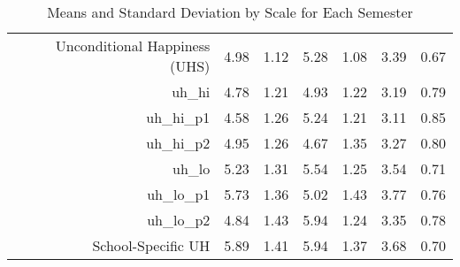 \begin{table}[ht]
\begin{tabular}{rrrrrrr}
  Unconditional Happiness (UHS) & 4.98 & 1.12 & 5.28 & 1.08 & 3.39 & 0.67 \\ 
  uh\_hi & 4.78 & 1.21 & 4.93 & 1.22 & 3.19 & 0.79 \\ 
  uh\_hi\_p1 & 4.58 & 1.26 & 5.24 & 1.21 & 3.11 & 0.85 \\ 
  uh\_hi\_p2 & 4.95 & 1.26 & 4.67 & 1.35 & 3.27 & 0.80 \\ 
  uh\_lo & 5.23 & 1.31 & 5.54 & 1.25 & 3.54 & 0.71 \\ 
  uh\_lo\_p1 & 5.73 & 1.36 & 5.02 & 1.43 & 3.77 & 0.76 \\ 
  uh\_lo\_p2 & 4.84 & 1.43 & 5.94 & 1.24 & 3.35 & 0.78 \\ 
  School-Specific UH & 5.89 & 1.41 & 5.94 & 1.37 & 3.68 & 0.70 \\ 
   \hline
\end{tabular}
\caption{Means and Standard Deviation by Scale for Each Semester} 
\label{tab:summarystats}
\end{table}
